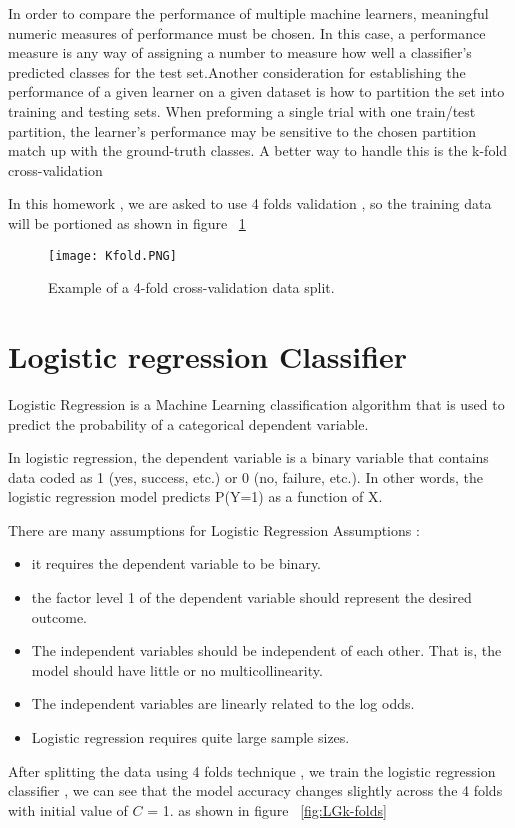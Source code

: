 \documentclass{article}
\begin{document}
In order to compare the performance of multiple machine learners, meaningful numeric measures of performance must be chosen. In this case, a performance measure is any way of assigning a number to measure how well a classifier’s predicted classes for the test set.Another consideration for establishing the performance of a given learner on a given
dataset is how to partition the set into training and testing sets. When preforming a single
trial with one train/test partition, the learner’s performance may be sensitive to the chosen
partition match up with the ground-truth classes.  A better way to handle this is the k-fold cross-validation


In this homework , we are asked to use 4 folds validation , so the training data will be portioned as shown in figure ~\ref {fig:kfold}

\begin{figure}[H]
	\centering
	\texttt{[image: Kfold.PNG]}\caption{{\small Example of a 4-fold cross-validation data split. }}
	\label{fig:kfold}
\end{figure}
\section{Logistic regression Classifier}
Logistic Regression is a Machine Learning classification algorithm that is used to predict the probability of a categorical dependent variable. 

In logistic regression, the dependent variable is a binary variable that contains data coded as 1 (yes, success, etc.) or 0 (no, failure, etc.). In other words, the logistic regression model predicts P(Y=1) as a function of X.

There are many assumptions for Logistic Regression Assumptions :
\begin{itemize}
	\item  it requires the dependent variable to be binary.
	\item the factor level 1 of the dependent variable should represent the desired outcome.
	\item The independent variables should be independent of each other. That is, the model should have little or no multicollinearity.
	\item The independent variables are linearly related to the log odds.
	\item Logistic regression requires quite large sample sizes.
\end{itemize}
After splitting the data using 4 folds technique , we train the logistic regression classifier , we can see that the model accuracy changes slightly across the 4 folds with initial value of $C$ = 1. as shown in figure ~\ref {fig:LGk-folds} 
\end{document}
